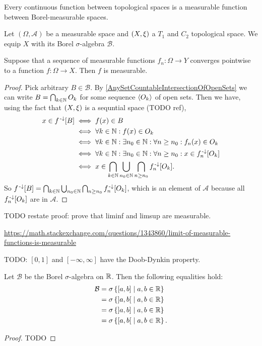 \begin{lemma}
Every continuous function between topological spaces is a measurable function between Borel-measurable spaces.
\end{lemma}

\begin{proposition} \label{pointWiseConvergenceMeasurable}
Let $(\Omega,\mathcal{A})$ be a measurable space and $\left( X,\xi \right)$ a $T_1$ and $C_2$ topological space. We equip $X$ with its Borel $\sigma$-algebra $\mathcal{B}$.

Suppose that a sequence of measurable functions $f_n : \Omega \to Y$ converges pointwise to a function $f:\Omega\to X$. Then $f$ is measurable.
\end{proposition}
\begin{proof}
Pick arbitrary $B\in \mathcal{B}$. By \ref{AnySetCountableIntersectionOfOpenSets} we can write $B = \bigcap_{k\in\mathbb{N}}O_k$ for some sequence $\left\langle O_k \right\rangle$ of open sets. Then we have, using the fact that $\left( X,\xi \right)$ is a sequntial space (TODO ref),
\begin{align*}
x\in f^{{\text{\hspace{0.15em}-}\downarrow}}[B] &\iff f(x)\in B \\
&\iff \forall k\in\mathbb{N}: f(x)\in O_k\\
&\iff \forall k\in\mathbb{N}: \exists n_0\in\mathbb{N}: \forall n\geq n_0: f_n(x)\in O_k \\
&\iff \forall k\in\mathbb{N}: \exists n_0\in\mathbb{N}: \forall n\geq n_0: x\in f^{{\text{\hspace{0.15em}-}\downarrow}}_n[O_k] \\
&\iff x\in \bigcap_{k\in\mathbb{N}}\bigcup_{n_0\in\mathbb{N}}\bigcap_{n\geq n_0}f^{{\text{\hspace{0.15em}-}\downarrow}}_n[O_k].
\end{align*}
So $f^{{\text{\hspace{0.15em}-}\downarrow}}[B] = \bigcap_{k\in\mathbb{N}}\bigcup_{n_0\in\mathbb{N}}\bigcap_{n\geq n_0}f^{{\text{\hspace{0.15em}-}\downarrow}}_n[O_k]$, which is an element of $\mathcal{A}$ because all $f^{{\text{\hspace{0.15em}-}\downarrow}}_n[O_k]$ are in $\mathcal{A}$.
\end{proof}
TODO restate proof: prove that liminf and limsup are measurable.

\url{https://math.stackexchange.com/questions/1343860/limit-of-measurable-functions-is-measurable}

\begin{proposition}
TODO: $[0,1]$ and $[-\infty,\infty]$ have the Doob-Dynkin property.
\end{proposition}

\begin{proposition}
Let $\mathcal{B}$ be the Borel $\sigma$-algebra on $\mathbb{R}$. Then the following equalities hold:
\begin{align*}
\mathcal{B} &= \sigma\left\{ [a,b] \;\middle|\; a,b\in \mathbb{R} \right\} \\
&= \sigma\left\{ ]a,b[ \;\middle|\; a,b\in \mathbb{R} \right\} \\
&= \sigma\left\{ ]a,b] \;\middle|\; a,b\in \mathbb{R} \right\} \\
&= \sigma\left\{ [a,b[ \;\middle|\; a,b\in \mathbb{R} \right\}.
\end{align*}
\end{proposition}
\begin{proof}
TODO
\end{proof}


